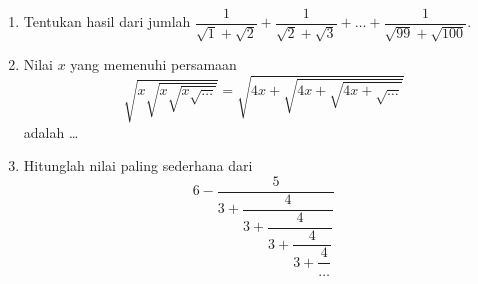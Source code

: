 \begin{enumerate}
\item Tentukan hasil dari jumlah $\dfrac{1}{\sqrt{1}+\sqrt{2}}+\dfrac{1}{\sqrt{2}+\sqrt{3}}+\dots+\dfrac{1}{\sqrt{99}+\sqrt{100}}.$

\item Nilai $x$ yang memenuhi persamaan
$$\sqrt{x\sqrt{x\sqrt{x\sqrt{\dots}}}}=\sqrt{4x+\sqrt{4x+\sqrt{4x+\sqrt{\dots}}}}$$
adalah \dots

\item Hitunglah nilai paling sederhana dari
$$6-\dfrac{5}{3+\dfrac{4}{3+\dfrac{4}{3+\dfrac{4}{3+\dfrac{4}{\dots}}}}}$$
\end{enumerate}